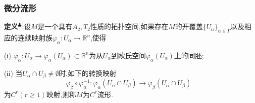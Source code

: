 \subsubsection{微分流形}
\textbf{定义}$^\clubsuit $:设$M$是一个具有$A_2,T_2$性质的拓扑空间,如果存在$M$的开覆盖$\{U_{\alpha}\}_{\alpha\in\Gamma}$以及相应的连续映射族$\varphi_{\alpha}:U_{\alpha}\to\mathbb{R}^n$,使得\par
(i) $\varphi_{\alpha}:U_{\alpha}\to \varphi_{\alpha}(U_{\alpha})\subset\mathbb{R}^n$为从$U_{\alpha}$到欧氏空间$\varphi_{\alpha}(U_{\alpha})$上的同胚;\par
(ii) 当$U_{\alpha}\cap U_{\beta}\neq \emptyset$时,如下的转换映射
$$
\varphi_{\beta}\circ \varphi_{\alpha}^{-1}:\varphi_{\alpha}(U_{\alpha}\cap U_{\beta})\to \varphi_{\beta}(U_{\alpha}\cap U_{\beta})
$$
为$C^r(r\geqslant 1)$映射,则称$M$为$C^r$流形.\par
